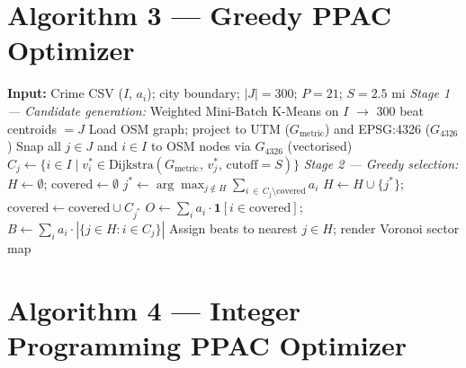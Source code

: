 \documentclass[12pt]{article}
\begin{document}
\section{Algorithm 3 — Greedy PPAC Optimizer}

\begin{algorithm}[H]
\caption{Greedy PPAC Optimizer}
\begin{algorithmic}[1]
\State \textbf{Input:} Crime CSV ($I$, $a_i$); city boundary; $|J|=300$;
       $P=21$; $S=2.5$ mi
\State \textit{Stage 1 — Candidate generation:}
    Weighted Mini-Batch K-Means on $I$ $\to$ 300 beat centroids $= J$
\State Load OSM graph; project to UTM ($G_{\text{metric}}$) and EPSG:4326 ($G_{\text{4326}}$)
\State Snap all $j \in J$ and $i \in I$ to OSM nodes via $G_{\text{4326}}$ (vectorised)
    \State $C_j \leftarrow \{i \in I \mid v^*_i \in
           \text{Dijkstra}(G_{\text{metric}},\, v^*_j,\, \text{cutoff}=S)\}$
\EndFor
\State \textit{Stage 2 — Greedy selection:}
    $H \leftarrow \emptyset$; \; $\text{covered} \leftarrow \emptyset$
    \State $j^* \leftarrow \arg\max_{j \notin H}
           \displaystyle\sum_{i \,\in\, C_j \setminus \text{covered}} a_i$
    \State $H \leftarrow H \cup \{j^*\}$;\quad
           $\text{covered} \leftarrow \text{covered} \cup C_{j^*}$
\EndFor
\State $O \leftarrow \sum_i a_i \cdot \mathbf{1}[i \in \text{covered}]$;\quad
       $B \leftarrow \sum_i a_i \cdot |\{j \in H : i \in C_j\}|$
\State Assign beats to nearest $j \in H$; render Voronoi sector map
\end{algorithmic}
\end{algorithm}

\section{Algorithm 4 — Integer Programming PPAC Optimizer}
\end{document}

